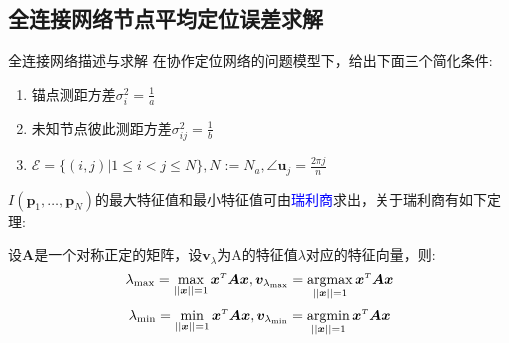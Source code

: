 \subsection{全连接网络节点平均定位误差求解}\label{subsection:complete_graph_cooperation}
{全连接网络描述与求解}
在协作定位网络的问题模型下，给出下面三个简化条件:
\begin{enumerate}
\item 锚点测距方差$\sigma_i^2=\frac{1}{a}$
\item 未知节点彼此测距方差$\sigma^2_{ij}=\frac{1}{b}$
\item $\mathcal{E}=\{(i,j)|1\leq i <j\leq N\},N:=N_a,\angle\bm{u}_j=\frac{2\pi j}{n}$
\end{enumerate}
$I(\bm{p}_1,\dots,\bm{p}_N)$的最大特征值和最小特征值可由\textcolor{blue}{瑞利商}求出，关于瑞利商有如下定理:
\begin{theorem}\label{theorem:rayleigh}
  设$\bm{A}$是一个对称正定的矩阵，设$\bm{v}_{\lambda}$为A的特征值$\lambda$对应的特征向量，则:
\[
\displaystyle\lambda_{\text{max}}=\max_{||\bm{x}||=1} \bm{x}^{\scriptscriptstyle T}\bm{A}\bm{x},\bm{v}_{\lambda_{\text{max}}}=\operatorname*{argmax}_{||\bm{x}||=1} \bm{x}^{\scriptscriptstyle T}\bm{A}\bm{x}
\]\[
\displaystyle\lambda_{\text{min}}=\min_{||\bm{x}||=1} \bm{x}^{\scriptscriptstyle T}\bm{A}\bm{x},\bm{v}_{\lambda_{\text{min}}}=\operatorname*{argmin}_{||\bm{x}||=1} \bm{x}^{\scriptscriptstyle T}\bm{A}\bm{x}
\]
\end{theorem}


